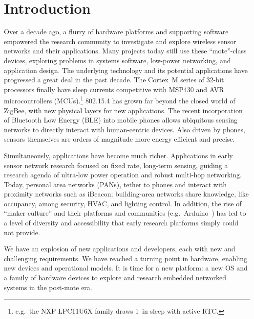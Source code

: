 \section{Introduction}
\label{sec:intro}

Over a decade ago, a flurry of hardware platforms and supporting software
empowered the research community to investigate and explore wireless sensor
networks and their applications. Many projects today still use these
``mote''-class devices, exploring problems in systems software, low-power
networking, and application design.
%
The underlying technology and its potential applications have progressed a
great deal in the past decade. The Cortex~M series of 32-bit processors
finally have sleep currents competitive with MSP430 and AVR microcontrollers
(MCUs).\footnote{
  e.g.\ the NXP LPC11U6X family draws 1~\uA in sleep with active RTC.
}
802.15.4 has grown far beyond the closed world of ZigBee, with
new physical layers for new applications. The recent incorporation of
Bluetooth Low Energy (BLE) into mobile phones allows ubiquitous sensing networks to
directly interact with human-centric devices. Also driven by phones, sensors
themselves are orders of magnitude more energy efficient and precise.

Simultaneously, applications have become much richer. Applications in early
sensor network research focused on fixed rate, long-term sensing, guiding a
research agenda of ultra-low power operation and robust multi-hop networking.
Today, personal area networks (PANs), tether to phones and interact with
proximity networks such as iBeacon; building-area networks share knowledge, like
occupancy, among security, HVAC, and lighting control.
In addition, the rise of ``maker culture'' and their platforms and communities
(e.g.\ Arduino~\cite{arduino}) has led to a level of diversity and
accessibility that early research platforms simply could not provide.

We have an explosion of new applications and developers, each with new and challenging
requirements. We have reached a turning point in hardware, enabling 
new devices and operational models. It is time for a new platform:
a new OS and a family
of hardware devices to explore and research embedded networked systems in
the post-mote era.

